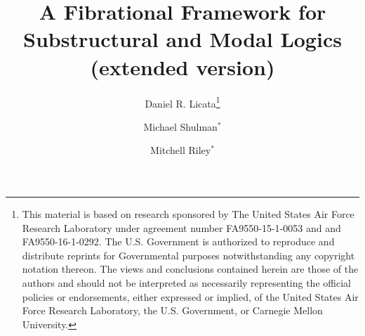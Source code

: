 \documentclass{article}
\begin{document}
\title{A Fibrational Framework for Substructural and Modal Logics \\ (extended version)}

\author[1]{{Daniel R. Licata}\thanks{This material is based on research
    sponsored by The United States Air Force Research Laboratory under
    agreement number FA9550-15-1-0053 and and FA9550-16-1-0292.  The
    U.S. Government is authorized to reproduce and distribute reprints
    for Governmental purposes notwithstanding any copyright notation
    thereon.  The views and conclusions contained herein are those of
    the authors and should not be interpreted as necessarily
    representing the official policies or endorsements, either expressed
    or implied, of the United States Air Force Research Laboratory, the
    U.S. Government, or Carnegie Mellon University.}}
\author[2]{{Michael Shulman}$^*$} 
\author[1]{{Mitchell Riley}$^*$}  

\maketitle
\end{document}

